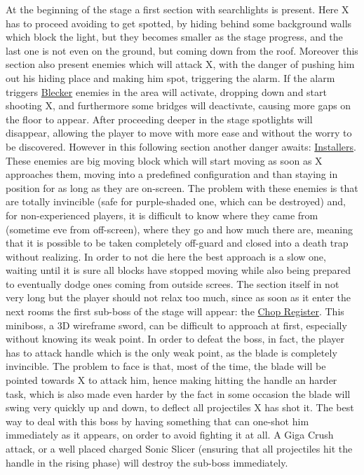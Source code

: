 At the beginning of the stage a first section with searchlights is present. Here X has to proceed avoiding to get spotted, by hiding behind some background walls which block the light, but they becomes smaller as the stage progress, and the last one is not even on the ground, but coming down from the roof. Moreover this section also present enemies which will attack X, with the danger of pushing him out his hiding place and making him spot, triggering the alarm. If the alarm triggers \hyperlink{enem:Blecker}{Blecker} enemies in the area will activate, dropping down and start shooting X, and furthermore some bridges will deactivate, causing more gaps on the floor to appear. After proceeding deeper in the stage spotlights will disappear, allowing the player to move with more ease and without the worry to be discovered. However in this following section another danger awaits: \hyperlink{enem:Installer}{Installers}. These enemies are big moving block which will start moving as soon as X approaches them, moving into a predefined configuration and than staying in position for as long as they are on-screen. The problem with these enemies is that are totally invincible (safe for purple-shaded one, which can be destroyed) and, for non-experienced players, it is difficult to know where they came from (sometime eve from off-screen), where they go and how much there are, meaning that it is possible to be taken completely off-guard and closed into a death trap without realizing. In order to not die here the best approach is a slow one, waiting until it is sure all blocks have stopped moving while also being prepared to eventually dodge ones coming from outside screes. The section itself in not very long but the player should not relax too much, since as soon as it enter the next rooms the first sub-boss of the stage will appear: the \hyperlink{miniboss:Chop_Register}{Chop Register}. This miniboss, a 3D wireframe sword, can be difficult to approach at first, especially without knowing its weak point. In order to defeat the boss, in fact, the player has to attack handle which is the only weak point, as the blade is completely invincible. The problem to face is that, most of the time, the blade will be pointed towards X to attack him, hence making hitting the handle an harder task, which is also made even harder by the fact in some occasion the blade will swing very quickly up and down, to deflect all projectiles X has shot it. The best way to deal with this boss by having something that can one-shot him immediately as it appears, on order to avoid fighting it at all. A Giga Crush attack, or a well placed charged Sonic Slicer (ensuring that all projectiles hit the handle in the rising phase) will destroy the sub-boss immediately.

